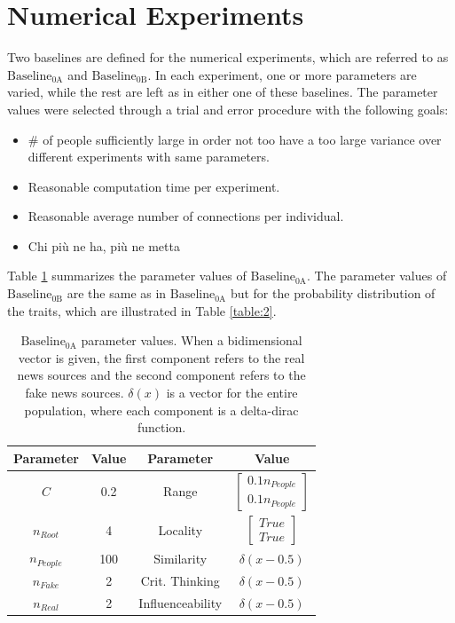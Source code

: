 \section{Numerical Experiments}
\label{sec:experiments}
Two baselines are defined for the numerical experiments, which are referred to as $\text{Baseline}_\text{0A}$ and $\text{Baseline}_\text{0B}$. In each experiment, one or more parameters are varied, while the rest are left as in either one of these baselines. The parameter values were selected through a trial and error procedure with the following goals:
\begin{itemize}
	\item
	$\#$ of people sufficiently large in order not too have a too large variance over different experiments with same parameters.
	\item
	Reasonable computation time per experiment.
	\item
	Reasonable average number of connections per individual.
	\item
	Chi più ne ha, più ne metta
\end{itemize}
Table \ref{table:1} summarizes the parameter values of $\text{Baseline}_\text{0A}$. \newline
The parameter values of $\text{Baseline}_\text{0B}$ are the same as in $\text{Baseline}_\text{0A}$ but for the probability distribution of the traits, which are illustrated in Table \ref{table:2}.
\begin{table}[h!]
\centering
\begin{tabular}{||c | c || c | c ||}
	\hline
	Parameter&Value&Parameter&Value\\
	\hline
	$C$&0.2&Range& $\begin{bmatrix} 0.1n_{People} \\ 0.1 n_{People}\end{bmatrix}$\\
	$n_{Root}$&4&Locality&$\begin{bmatrix} True \\ True\end{bmatrix}$\\
	$n_{People}$&100&Similarity&$\delta(x-0.5)$\\
	$n_{Fake}$&2&Crit. Thinking&$\delta(x-0.5)$\\
	$n_{Real}$&2&Influenceability&$\delta(x-0.5)$\\
	\hline
\end{tabular}
\newline
\caption{$\text{Baseline}_\text{0A}$ parameter values. When a bidimensional vector is given, the first component refers to the real news sources and the second component refers to the fake news sources. $\delta(x)$ is a vector for the entire population, where each component is a delta-dirac function.}
\label{table:1}
\end{table}

